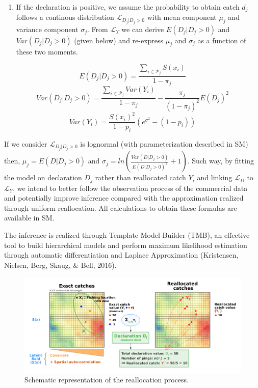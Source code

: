 \documentclass[
  english,
  man,floatsintext]{apa6}
\providecommand{\tightlist}{%
  \setlength{\itemsep}{0pt}\setlength{\parskip}{0pt}}
\begin{document}
\begin{enumerate}
\def\labelenumi{(\arabic{enumi})}
\setcounter{enumi}{1}
\tightlist
\item
  If the declaration is positive, we assume the probability to obtain catch \(d_j\) follows a continous distribution \(\mathcal{L}_{D_j|D_j>0}\) with mean component \(\mu_j\) and variance component \(\sigma_j\). From \(\mathcal{L}_Y\) we can derive \(E(D_j \vert D_j > 0)\) and \(Var(D_j \vert D_j > 0)\) (given below) and re-express \(\mu_j\) and \(\sigma_j\) as a function of these two moments.
\end{enumerate}

\[E(D_j \vert D_j > 0)=\frac{\sum_{i \in \mathcal{P}_j} S(x_{i})}{1-\pi_j}\]
\[Var(D_j \vert D_j > 0) = \frac{\sum_{i \in \mathcal{P}_j} Var(Y_{i})}{1-\pi_j} - \frac{\pi_j}{(1-\pi_j)^2}E(D_j)^2\]
\[Var(Y_{i})=\frac{S(x_{i})^2}{1-p_{i}}(e^{\sigma^2}-(1-p_{i}))\]

If we consider \(\mathcal{L}_{D_j|D_j>0}\) is lognormal (with parameterization described in SM) then, \(\mu_j = E(D|D_j>0)\) and \(\sigma_j = ln(\frac{Var(D|D_j>0)}{E(D|D_j>0)^2} + 1)\). Such way, by fitting the model on declaration \(D_j\) rather than reallocated catch \(Y_i\) and linking \(\mathcal{L}_D\) to \(\mathcal{L}_Y\), we intend to better follow the observation process of the commercial data and potentially improve inference compared with the approximation realized through uniform reallocation. All calculations to obtain these formulas are available in SM.

The inference is realized through Template Model Builder (TMB), an effective tool to build hierarchical models and perform maximum likelihood estimation through automatic differentiation and Laplace Approximation (Kristensen, Nielsen, Berg, Skaug, \& Bell, 2016).

\begin{figure}
\centering
\includegraphics{images/realloc.png}
\caption{\label{fig:SchemeRealloc} Schematic representation of the reallocation process.}
\end{figure}
\end{document}
